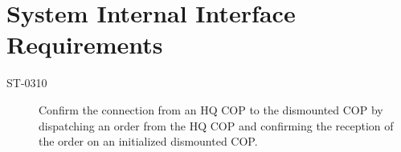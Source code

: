 \section{System Internal Interface Requirements}

\begin{description}
\item[ST-0310]	Confirm the connection from an HQ COP to the dismounted COP by dispatching an order from the HQ COP and confirming the reception of the order on an initialized dismounted COP.
\end{description}